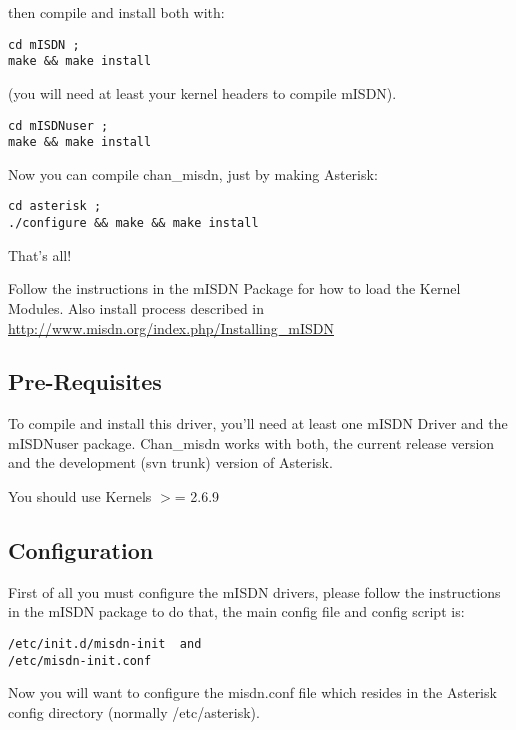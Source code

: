 then compile and install both with:
\begin{astlisting}
\begin{verbatim}
cd mISDN ;
make && make install
\end{verbatim}
\end{astlisting}
(you will need at least your kernel headers to compile mISDN).
\begin{astlisting}
\begin{verbatim}
cd mISDNuser ;
make && make install
\end{verbatim}
\end{astlisting}
Now you can compile chan\_misdn, just by making Asterisk:
\begin{astlisting}
\begin{verbatim}
cd asterisk ;
./configure && make && make install
\end{verbatim}
\end{astlisting}
That's all!

Follow the instructions in the mISDN Package for how to load the Kernel
Modules. Also install process described in \url{http://www.misdn.org/index.php/Installing_mISDN}

\subsection{Pre-Requisites}

To compile and install this driver, you'll need at least one mISDN Driver and
the mISDNuser package. Chan\_misdn works with both, the current release version
and the development (svn trunk) version of Asterisk.

You should use Kernels $>$= 2.6.9


\subsection{Configuration}

First of all you must configure the mISDN drivers, please follow the
instructions in the mISDN package to do that, the main config file and config
script is:
\begin{astlisting}
\begin{verbatim}
/etc/init.d/misdn-init  and
/etc/misdn-init.conf
\end{verbatim}
\end{astlisting}
Now you will want to configure the misdn.conf file which resides in the
Asterisk config directory (normally /etc/asterisk).

